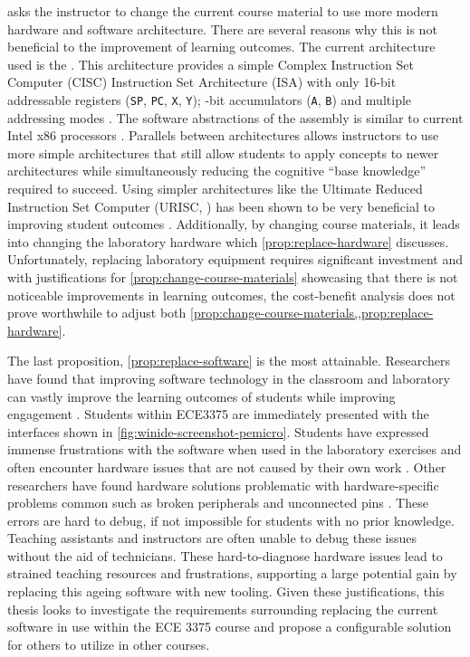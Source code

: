  asks the instructor to change the current course material to use more modern hardware and software architecture. There are several reasons why this is not beneficial to the improvement of learning outcomes. The current architecture used is the \hcmodel{}. This architecture provides a simple Complex Instruction Set Computer (CISC) Instruction Set Architecture (ISA) with only  16-bit addressable registers (\verb|SP|, \verb|PC|, \verb|X|, \verb|Y|);  -bit accumulators (\verb|A|, \verb|B|) and multiple addressing modes \cite{hc12Manual2006}. The software abstractions of the \hcmodel{} assembly is similar to current Intel\textregistered{} x86 processors \cite{intel2017}. Parallels between architectures allows instructors to use more simple architectures that still allow students to apply concepts to newer architectures while simultaneously reducing the cognitive ``base knowledge'' required to succeed. Using simpler architectures like the Ultimate Reduced Instruction Set Computer (URISC, \cite{Mavaddat1988}) has been shown to be very beneficial to improving student outcomes \cite{Nakamura2013, McLoughlin2010, Mavaddat1988, Djordjevic2005, Garcia2009}. Additionally, by changing course materials, it leads into changing the laboratory hardware which \cref{prop:replace-hardware} discusses. Unfortunately, replacing laboratory equipment requires significant investment and with justifications for \cref{prop:change-course-materials} showcasing that there is not noticeable improvements in learning outcomes, the cost-benefit analysis does not prove worthwhile to adjust both \cref{prop:change-course-materials,,prop:replace-hardware}.

The last proposition, \cref{prop:replace-software} is the most attainable. Researchers have found that improving software technology in the classroom and laboratory can vastly improve the learning outcomes of students while improving engagement \cite{Ackovska2014, Stolikj2011, Ristov2011, Ristov2014, Nikolic2009, Skillen2011, Tappan2009, Djordjevic2005, cec2016}. Students within ECE3375 are immediately presented with the interfaces shown in \cref{fig:winide-screenshot-pemicro}. Students have expressed immense frustrations with the software when used in the laboratory exercises and often encounter hardware issues that are not caused by their own work \cite{evals:ece3375-2013, evals:ece3375-2014}. Other researchers have found hardware solutions problematic with hardware-specific problems common such as broken peripherals and unconnected pins \cite{Ackovska2014}. These errors are hard to debug, if not impossible for students with no prior knowledge. Teaching assistants and instructors are often unable to debug these issues without the aid of technicians. These hard-to-diagnose hardware issues lead to strained teaching resources and frustrations, supporting a large potential gain by replacing this ageing software with new tooling. Given these justifications, this thesis looks to investigate the requirements surrounding replacing the current software in use within the ECE 3375 course and propose a configurable solution for others to utilize in other courses. 

